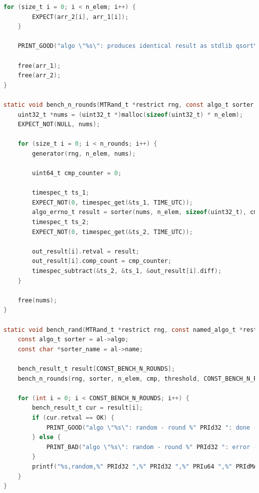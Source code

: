 \documentclass[12pt]{article}
\begin{document}
\begin{lstlisting}[language=C]
    for (size_t i = 0; i < n_elem; i++) {
        EXPECT(arr_2[i], arr_1[i]);
    }

    PRINT_GOOD("algo \"%s\": produces identical result as stdlib qsort\n", sorter_name);

    free(arr_1);
    free(arr_2);
}

static void bench_n_rounds(MTRand_t *restrict rng, const algo_t sorter, size_t n_elem, comp_t cmp, uint64_t threshold, size_t n_rounds, gen_data_t generator, bench_result_t *restrict out_result) {
    uint32_t *nums = (uint32_t *)malloc(sizeof(uint32_t) * n_elem);
    EXPECT_NOT(NULL, nums);

    for (size_t i = 0; i < n_rounds; i++) {
        generator(rng, n_elem, nums);

        uint64_t cmp_counter = 0;

        timespec_t ts_1;
        EXPECT_NOT(0, timespec_get(&ts_1, TIME_UTC));
        algo_errno_t result = sorter(nums, n_elem, sizeof(uint32_t), cmp, threshold, &cmp_counter);
        timespec_t ts_2;
        EXPECT_NOT(0, timespec_get(&ts_2, TIME_UTC));

        out_result[i].retval = result;
        out_result[i].comp_count = cmp_counter;
        timespec_subtract(&ts_2, &ts_1, &out_result[i].diff);
    }

    free(nums);
}

static void bench_rand(MTRand_t *restrict rng, const named_algo_t *restrict al, size_t n_elem, comp_t cmp, uint64_t threshold) {
    const algo_t sorter = al->algo;
    const char *sorter_name = al->name;

    bench_result_t result[CONST_BENCH_N_ROUNDS];
    bench_n_rounds(rng, sorter, n_elem, cmp, threshold, CONST_BENCH_N_ROUNDS, gen_rand_data, result);

    for (int i = 0; i < CONST_BENCH_N_ROUNDS; i++) {
        bench_result_t cur = result[i];
        if (cur.retval == OK) {
            PRINT_GOOD("algo \"%s\": random - round %" PRId32 ": done - %" PRIu64 " comps - %" PRIdMAX ".%09" PRId32 " sec\n", sorter_name, i + 1, cur.comp_count, (intmax_t)cur.diff.tv_sec, cur.diff.tv_nsec);
        } else {
            PRINT_BAD("algo \"%s\": random - round %" PRId32 ": error - %" PRIu64 " comps - %" PRIdMAX ".%09" PRId32 " sec\n", sorter_name, i + 1, cur.comp_count, (intmax_t)cur.diff.tv_sec, cur.diff.tv_nsec);
        }
        printf("%s,random,%" PRId32 ",%" PRId32 ",%" PRIu64 ",%" PRIdMAX ".%09" PRId32 "\n", sorter_name, cur.retval, i + 1, cur.comp_count, (intmax_t)cur.diff.tv_sec, cur.diff.tv_nsec);
    }
}


\end{lstlisting}
\end{document}

